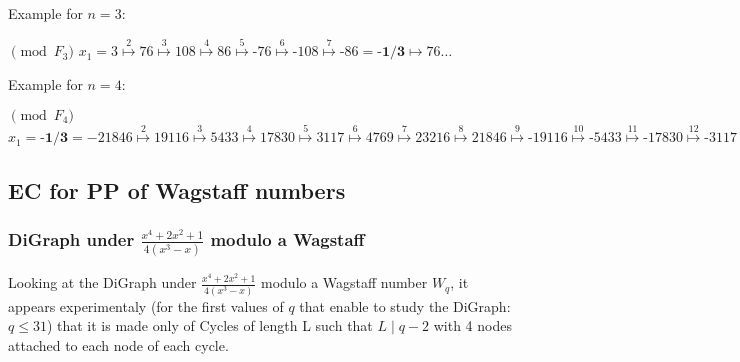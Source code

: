 \documentclass[latin1]{quadrature}
\newcommand{\PMod}[1]{\!\!\pmod{#1}}
\newif\ifenfrancais
\begin{document}
\begin{article}
\begin{article}
\ifenfrancais
Example pour $n=3$:
\else
Example for $n=3$:
\fi

$\PMod{F_{3}}$ $x_1 = 3
\stackrel{2}{\mapsto} \text{76}
\stackrel{3}{\mapsto} \text{108}
\stackrel{4}{\mapsto} \text{86}
\stackrel{5}{\mapsto} \text{-76}
\stackrel{6}{\mapsto} \text{-108}
\stackrel{7}{\mapsto} \text{-86} = \textbf{-1/3}
\stackrel{}{\mapsto} \text{76} \dots $

\ifenfrancais
Example pour $n=4$:
\else
Example for $n=4$:
\fi


$\PMod{F_{4}}$ $x_1 = \textbf{-1/3} = -21846
\stackrel{2}{\mapsto} \text{19116}
\stackrel{3}{\mapsto} \text{5433}
\stackrel{4}{\mapsto} \text{17830}
\stackrel{5}{\mapsto} \text{3117}
\stackrel{6}{\mapsto} \text{4769}
\stackrel{7}{\mapsto} \text{23216}
\stackrel{8}{\mapsto} \text{21846}
\stackrel{9}{\mapsto} \text{-19116}
\stackrel{10}{\mapsto} \text{-5433}
\stackrel{11}{\mapsto} \text{-17830}
\stackrel{12}{\mapsto} \text{-3117}
\stackrel{13}{\mapsto} \text{-4769}
\stackrel{14}{\mapsto} \text{-23216}
\stackrel{15}{\mapsto} \text{-21846} = \textbf{-1/3}$

\ifenfrancais
\subsection { CE pour PP des nombres de Wagstaff }
\else
\subsection { EC for PP of Wagstaff numbers }
\fi

\ifenfrancais
\subsubsection { DiGraph sous $\frac{\displaystyle x^4+2x^2+1}{\displaystyle 4(x^3-x)}$ modulo un nombre de Wagstaff }
\else
\subsubsection { DiGraph under $\frac{\displaystyle x^4+2x^2+1}{\displaystyle 4(x^3-x)}$ modulo a Wagstaff }
\fi


\ifenfrancais
Si l'on regarde le DiGraph sous $\frac{\displaystyle x^4+2x^2+1}{\displaystyle 4(x^3-x)}$ modulo un nombre de Wagstaff $W_q$ premier, il appara\^it exp\'erimentalement (pour les premi\`eres valeurs de $q$ qui permettent d'\'etudier le DiGraph: $q \leq 31$) qu'il est constitu\'e uniquement de Cycles de longeur L telle que $L \mid q-2$ avec 4 n\oe uds attach\'es \`a chaque n\oe ud de chaque Cycle.
\else
Looking at the DiGraph under $\frac{\displaystyle x^4+2x^2+1}{\displaystyle 4(x^3-x)}$ modulo a Wagstaff number $W_q$, it appears experimentaly (for the first values of $q$ that enable to study the DiGraph: $q \leq 31$) that it is made only of Cycles of length L such that $L \mid q-2$ with 4 nodes attached to each node of each cycle.
\fi


\end{article}
\end{article}
\end{document}
